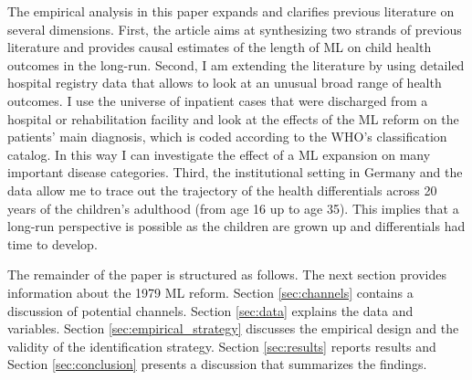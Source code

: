\documentclass[11pt, a4paper]{article} %
\begin{document}
The empirical analysis in this paper expands and clarifies previous literature on several dimensions. First, the article aims at synthesizing two strands of previous literature and provides causal estimates of the length of ML on child health outcomes in the long-run. Second, I am extending the literature by using detailed hospital registry data that allows to look at an unusual broad range of health outcomes. I use the universe of inpatient cases that were discharged from a hospital or rehabilitation facility and look at the effects of the ML reform on the patients' main diagnosis, which is coded according to the WHO's classification catalog. In this way I can investigate the effect of a ML expansion on many important disease categories. Third, the institutional setting in Germany and the data allow me to trace out the trajectory of the health differentials across 20 years of the children's adulthood (from age 16 up to age 35). This implies that a long-run perspective is possible as the children are grown up and differentials had time to develop. \newline


The remainder of the paper is structured as follows. The next section provides information about the 1979 ML reform. Section \ref{sec:channels} contains a discussion of potential channels. Section \ref{sec:data} explains the data and variables. Section \ref{sec:empirical_strategy} discusses the empirical design and the validity of the identification strategy. Section \ref{sec:results} reports results and Section \ref{sec:conclusion} presents a discussion that summarizes the findings. 
\end{document}

